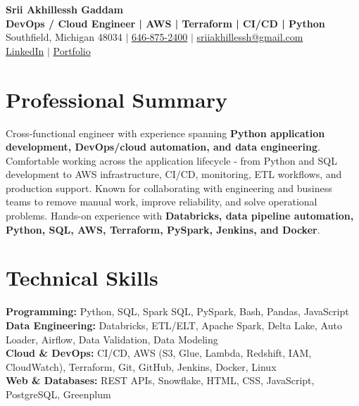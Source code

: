 \documentclass[letterpaper,10pt]{article}
\begin{document}
\fontsize{9.35pt}{10.45pt}\selectfont

\begin{center}
    {\LARGE \textbf{Srii Akhillessh Gaddam}} \\[-1pt]
    \textbf{DevOps / Cloud Engineer | AWS | Terraform | CI/CD | Python} \\[2pt]
    Southfield, Michigan 48034 $|$
    \href{tel:6468752400}{646-875-2400} $|$
    \href{mailto:sriiakhillessh@gmail.com}{sriiakhillessh@gmail.com} \\[1pt]
    \href{https://www.linkedin.com/in/srii-akhiilessh-gaddam-b48668191/}{LinkedIn} $|$
    \href{https://sriiakhillesshg.github.io/portfolio/}{Portfolio}
\end{center}
\vspace{-8pt}

\section{Professional Summary}
\small{Cross-functional engineer with experience spanning \textbf{Python application development, DevOps/cloud automation, and data engineering}. Comfortable working across the application lifecycle - from Python and SQL development to AWS infrastructure, CI/CD, monitoring, ETL workflows, and production support. Known for collaborating with engineering and business teams to remove manual work, improve reliability, and solve operational problems. Hands-on experience with \textbf{Databricks, data pipeline automation, Python, SQL, AWS, Terraform, PySpark, Jenkins, and Docker}.}

\section{Technical Skills}
\small{
\textbf{Programming:} Python, SQL, Spark SQL, PySpark, Bash, Pandas, JavaScript \\
\textbf{Data Engineering:} Databricks, ETL/ELT, Apache Spark, Delta Lake, Auto Loader, Airflow, Data Validation, Data Modeling \\
\textbf{Cloud \& DevOps:} CI/CD, AWS (S3, Glue, Lambda, Redshift, IAM, CloudWatch), Terraform, Git, GitHub, Jenkins, Docker, Linux \\
\textbf{Web \& Databases:} REST APIs, Snowflake, HTML, CSS, JavaScript, PostgreSQL, Greenplum
}
\end{document}
